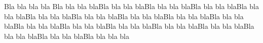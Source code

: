 \documentclass[10pt, a4paper]{article}
\begin{document}
Bla bla bla bla Bla bla bla blaBla bla bla blaBla bla bla blaBla bla bla blaBla bla bla blaBla bla bla blaBla bla bla blaBla bla bla blaBla bla bla blaBla bla bla blaBla bla bla blaBla bla bla blaBla bla bla blaBla bla bla blaBla bla bla blaBla bla bla blaBla bla bla blaBla bla bla bla
\end{document}
